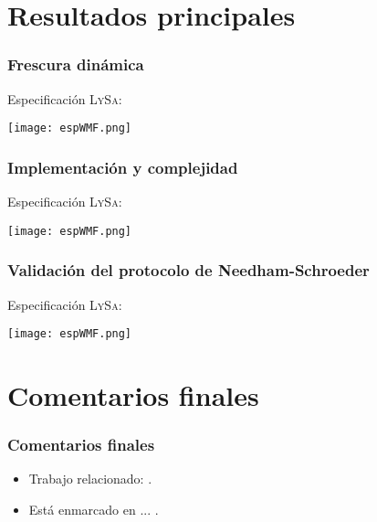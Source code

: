 \documentclass{beamer}
\begin{document}
\section{Resultados principales}

\begin{frame}
    \frametitle{Frescura dinámica}
    \pause
    Especificación L\textsc{y}S\textsc{a}:
    \pause[2]
    \begin{center}
        \texttt{[image: espWMF.png]}
    \end{center}
\end{frame}

\begin{frame}
    \frametitle{Implementación y complejidad}
    \pause
    Especificación L\textsc{y}S\textsc{a}:
    \pause[2]
    \begin{center}
        \texttt{[image: espWMF.png]}
    \end{center}
\end{frame}

\begin{frame}
    \frametitle{Validación del protocolo de Needham-Schroeder}
    \pause
    Especificación L\textsc{y}S\textsc{a}:
    \pause[2]
    \begin{center}
        \texttt{[image: espWMF.png]}
    \end{center}
\end{frame}

\section{Comentarios finales}

\begin{frame}
    \frametitle{Comentarios finales}
    \pause 
    \begin{itemize}
    \item<2-> Trabajo relacionado: .
    \item<3-> Está enmarcado en ... .
    \end{itemize}
\end{frame}
\end{document}
